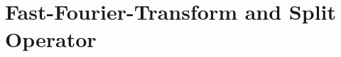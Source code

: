 \documentclass[../classnotes.tex]{subfiles}
\begin{document}
\chapter{Fast-Fourier-Transform and Split Operator}

\end{document}
